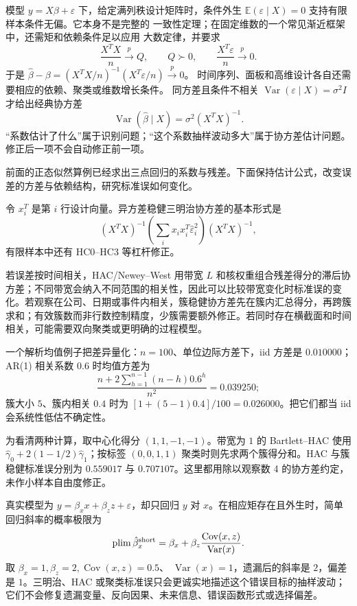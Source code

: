 模型 $y=X\beta+\varepsilon$ 下，给定满列秩设计矩阵时，条件外生
$\mathbb E(\varepsilon\mid X)=0$ 支持有限样本条件无偏。它本身不是完整的
一致性定理；在固定维数的一个常见渐近框架中，还需矩和依赖条件足以应用
大数定律，并要求
\[
 \frac{X^TX}{n}\xrightarrow{p}Q,\qquad Q\succ0,
 \qquad
 \frac{X^T\varepsilon}{n}\xrightarrow{p}0.
\]
于是
$\hat\beta-\beta=(X^TX/n)^{-1}(X^T\varepsilon/n)\xrightarrow{p}0$。
时间序列、面板和高维设计各自还需要相应的依赖、聚类或维数增长条件。
同方差且条件不相关
$\operatorname{Var}(\varepsilon\mid X)=\sigma^2I$ 才给出经典协方差
\[
 \operatorname{Var}(\hat\beta\mid X)=\sigma^2(X^TX)^{-1}.
\]
“系数估计了什么”属于识别问题；“这个系数抽样波动多大”属于协方差估计问题。修正后一项不会自动修正前一项。

前面的正态似然算例已经求出三点回归的系数与残差。下面保持估计公式，改变误差的方差与依赖结构，研究标准误如何变化。


令 $x_i^T$ 是第 $i$ 行设计向量。异方差稳健三明治协方差的基本形式是
\[
 (X^TX)^{-1}\left(\sum_i x_ix_i^T\hat\varepsilon_i^2\right)(X^TX)^{-1},
\]
有限样本中还有 HC0--HC3 等杠杆修正。

若误差按时间相关，HAC/Newey--West 用带宽 $L$ 和核权重组合残差得分的滞后协方差；不同带宽会纳入不同范围的相关性，因此可以比较带宽变化时标准误的变化。若观察在公司、日期或事件内相关，簇稳健协方差先在簇内汇总得分，再跨簇求和；有效簇数而非行数控制精度，少簇需要额外修正。若同时存在横截面和时间相关，可能需要双向聚类或更明确的过程模型。

一个解析均值例子把差异量化：$n=100$、单位边际方差下，iid 方差是 $0.010000$；AR(1) 相关系数 $0.6$ 时均值方差为
\[
 \frac{n+2\sum_{h=1}^{n-1}(n-h)0.6^h}{n^2}=0.039250;
\]
簇大小 $5$、簇内相关 $0.4$ 时为
$[1+(5-1)0.4]/100=0.026000$。把它们都当 iid 会系统性低估不确定性。

为看清两种计算，取中心化得分 $(1,1,-1,-1)$。带宽为 $1$ 的 Bartlett--HAC 使用
$\hat\gamma_0+2(1-1/2)\hat\gamma_1$；按标签 $(0,0,1,1)$ 聚类时则先求两个簇得分和。HAC 与簇稳健标准误分别为 $0.559017$ 与 $0.707107$。这里都用除以观察数 4 的协方差约定，未作小样本自由度修正。


真实模型为 $y=\beta_xx+\beta_zz+\varepsilon$，却只回归 $y$ 对 $x$。在相应矩存在且外生时，简单回归斜率的概率极限为
\[
 \operatorname{plim}\hat\beta_x^{\rm short}
 =\beta_x+\beta_z\frac{\operatorname{Cov}(x,z)}{\operatorname{Var}(x)}.
\]
取 $\beta_x=1,\beta_z=2,\operatorname{Cov}(x,z)=0.5$、
$\operatorname{Var}(x)=1$，遗漏后的斜率是 $2$，偏差是 $1$。三明治、HAC 或聚类标准误只会更诚实地描述这个错误目标的抽样波动；它们不会修复遗漏变量、反向因果、未来信息、错误函数形式或选择偏差。

